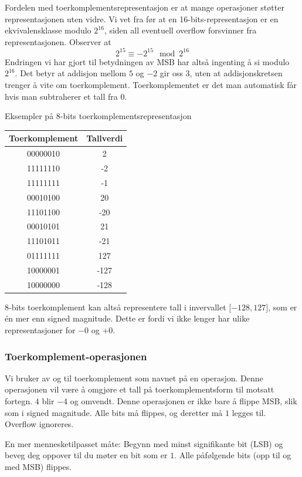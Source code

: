 \documentclass[12pt,a4paper,norsk]{article}
\begin{document}
Fordelen med toerkomplementsrepresentasjon er at mange operasjoner støtter
representasjonen uten vidre. Vi vet fra før at en 16-bits-representasjon er en
ekvivalensklasse modulo $2^{16}$, siden all eventuell overflow forsvinner fra
representasjonen. Observer at
\[2^{15} \equiv -2^{15} \mod 2^{16}\]
Endringen vi har gjort til betydningen av MSB har altså ingenting å si modulo
$2^{16}$. Det betyr at addisjon mellom $5$ og $-2$ gir oss $3$, uten at
addisjonskretsen trenger å vite om toerkomplement. Toerkomplementet er det man
automatisk får hvis man subtraherer et tall fra $0$.

\begin{center}
  Eksempler på 8-bits toerkomplementsrepresentasjon\\[5mm]
  \begin{tabular}{c|c}
    \toprule
    Toerkomplement & Tallverdi \\
    \midrule
    00000010 & 2 \\
    11111110 & -2 \\
    11111111 & -1 \\
    00010100 & 20 \\
    11101100 & -20 \\
    00010101 & 21 \\
    11101011 & -21 \\
    01111111 & 127 \\
    10000001 & -127 \\
    10000000 & -128 \\
    \bottomrule
  \end{tabular}
\end{center}

8-bits toerkomplement kan altså representere tall i invervallet $\lbrack-128,127\rbrack$,
som er én mer enn signed magnitude. Dette er fordi vi ikke lenger har ulike
representasjoner for $-0$ og $+0$.

\subsubsection{Toerkomplement-operasjonen}
Vi bruker av og til toerkomplement som navnet på en operasjon. Denne operasjonen
vil være å omgjøre et tall på toerkomplementsform til motsatt fortegn. $4$ blir
$-4$ og omvendt. Denne operasjonen er ikke bare å flippe MSB, slik som i signed
magnitude. Alle bits må flippes, og deretter må $1$ legges til. Overflow
ignoreres.

En mer mennesketilpasset måte: Begynn med minst signifikante bit (LSB) og beveg
deg oppover til du møter en bit som er $1$. Alle påfølgende bits (opp til og med
MSB) flippes.
\end{document}
